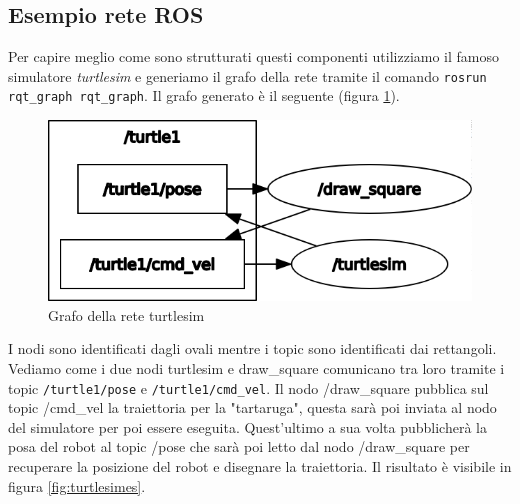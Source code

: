 \subsection{Esempio rete ROS}
\label{subsec:esempio_rete_ros}
Per capire meglio come sono strutturati questi componenti utilizziamo il famoso simulatore \textit{turtlesim} e generiamo il grafo della rete tramite il comando \verb+rosrun rqt_graph rqt_graph+. Il grafo generato è il seguente (figura \ref{fig:turtlesim}).
\begin{figure}[h!]
    \centering
    \includegraphics[scale=0.5]{images/turtlesim.png}
    \caption{Grafo della rete turtlesim}
    \label{fig:turtlesim}
\end{figure}
I nodi sono identificati dagli ovali mentre i topic sono identificati dai rettangoli. Vediamo come i due nodi turtlesim e draw\_square comunicano tra loro tramite i topic \verb+/turtle1/pose+ e \verb+/turtle1/cmd_vel+. Il nodo /draw\_square pubblica sul topic /cmd\_vel la traiettoria per la "tartaruga", questa sarà poi inviata al nodo del simulatore per poi essere eseguita. Quest'ultimo a sua volta pubblicherà la posa del robot al topic /pose che sarà poi letto dal nodo /draw\_square per recuperare la posizione del robot e disegnare la traiettoria.
Il risultato è visibile in figura \ref{fig:turtlesimes}.
